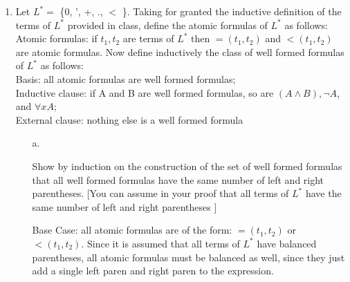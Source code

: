 
\usepackage{amsmath, dsfont, mathtools, verbatim, tikz, float, textcomp, mathrsfs}

\usetikzlibrary{arrows,automata}

\oddsidemargin 0in
\evensidemargin 0in
\textwidth 6.5in
\topmargin -0.5in
\textheight 9.0in
\newcommand{\norm}[1]{\left\lVert #1 \right\rVert}
\newcommand{\?}{\stackrel{?}{=}}
\DeclarePairedDelimiter{\ceil}{\lceil}{\rceil}



\pagestyle{myheadings}

\begin{enumerate}
  \item
    \begin{question}
      Let $L^* = $ \{0, ', +, ., $<$ \}. Taking for granted the inductive definition of the terms of $L^*$ provided in class, define the atomic formulas of $L^*$ as follows:\\
      Atomic formulas: if $t_1, t_2$ are terms of $L^*$ then $=(t_1,t_2)$ and $<(t_1,t_2)$ are atomic formulas. Now define inductively the class of well formed formulas of $L^*$ as follows:\\
      Basis: all atomic formulas are well formed formulas;\\
      Inductive clause: if A and B are well formed formulas, so are $(A \land B), \neg A$, and $\forall xA$;\\
      External clause: nothing else is a well formed formula
    \end{question}

    \begin{enumerate}
      \item [a.]
        \begin{question}
          Show by induction on the construction of the set of well formed formulas that all well formed formulas have the same number of left and right parentheses. [You can assume in your proof that all terms of $L^*$ have the same number of left and right parentheses ]\\
        \end{question}

        Base Case: all atomic formulas are of the form: $=(t_1,t_2)$ or $<(t_1,t_2)$. Since it is assumed that all terms of $L^*$ have balanced parentheses, all atomic formulas must be balanced as well, since they just add a single left paren and right paren to the expression.\\


\end{enumerate}
\end{enumerate}
